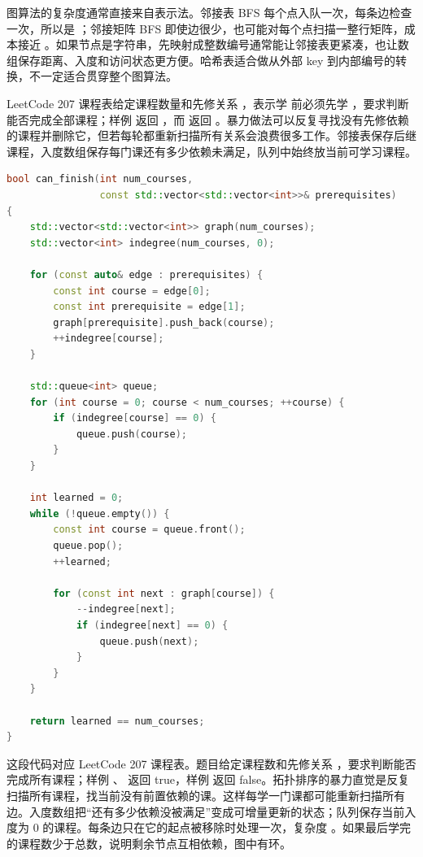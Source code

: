 图算法的复杂度通常直接来自表示法。邻接表 BFS 每个点入队一次，每条边检查一次，所以是 ；邻接矩阵 BFS 即使边很少，也可能对每个点扫描一整行矩阵，成本接近 。如果节点是字符串，先映射成整数编号通常能让邻接表更紧凑，也让数组保存距离、入度和访问状态更方便。哈希表适合做从外部 key 到内部编号的转换，不一定适合贯穿整个图算法。

LeetCode 207 课程表给定课程数量和先修关系 \code{[a,b]}，表示学  前必须先学 ，要求判断能否完成全部课程；样例  返回 ，而 \code{[[1,0],[0,1]]} 返回 。暴力做法可以反复寻找没有先修依赖的课程并删除它，但若每轮都重新扫描所有关系会浪费很多工作。邻接表保存后继课程，入度数组保存每门课还有多少依赖未满足，队列中始终放当前可学习课程。

\begin{lstlisting}[language=C++,caption={LeetCode 207 课程表：邻接表和入度数组}]
bool can_finish(int num_courses,
                const std::vector<std::vector<int>>& prerequisites)
{
    std::vector<std::vector<int>> graph(num_courses);
    std::vector<int> indegree(num_courses, 0);

    for (const auto& edge : prerequisites) {
        const int course = edge[0];
        const int prerequisite = edge[1];
        graph[prerequisite].push_back(course);
        ++indegree[course];
    }

    std::queue<int> queue;
    for (int course = 0; course < num_courses; ++course) {
        if (indegree[course] == 0) {
            queue.push(course);
        }
    }

    int learned = 0;
    while (!queue.empty()) {
        const int course = queue.front();
        queue.pop();
        ++learned;

        for (const int next : graph[course]) {
            --indegree[next];
            if (indegree[next] == 0) {
                queue.push(next);
            }
        }
    }

    return learned == num_courses;
}
\end{lstlisting}

这段代码对应 LeetCode 207 课程表。题目给定课程数和先修关系 ，要求判断能否完成所有课程；样例 、 返回 true，样例 \code{[[1,0],[0,1]]} 返回 false。拓扑排序的暴力直觉是反复扫描所有课程，找当前没有前置依赖的课。这样每学一门课都可能重新扫描所有边。入度数组把“还有多少依赖没被满足”变成可增量更新的状态；队列保存当前入度为 0 的课程。每条边只在它的起点被移除时处理一次，复杂度 。如果最后学完的课程数少于总数，说明剩余节点互相依赖，图中有环。

